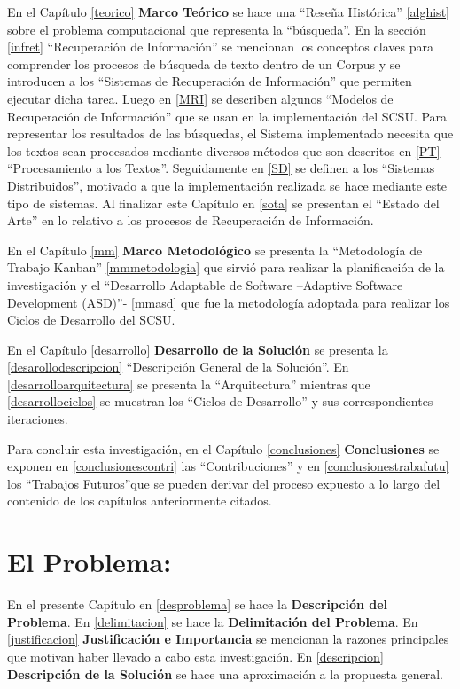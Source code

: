 \documentclass[
  12pt,
  openany]{book}
\begin{document}
En el Capítulo \ref{teorico} \textbf{Marco Teórico} se hace una ``Reseña Histórica'' \ref{alghist} sobre el problema computacional que representa la ``búsqueda''. En la sección \ref{infret} ``Recuperación de Información'' se mencionan los conceptos claves para comprender los procesos de búsqueda de texto dentro de un Corpus y se introducen a los ``Sistemas de Recuperación de Información'' que permiten ejecutar dicha tarea. Luego en \ref{MRI} se describen algunos ``Modelos de Recuperación de Información'' que se usan en la implementación del SCSU. Para representar los resultados de las búsquedas, el Sistema implementado necesita que los textos sean procesados mediante diversos métodos que son descritos en \ref{PT} ``Procesamiento a los Textos''. Seguidamente en \ref{SD} se definen a los ``Sistemas Distribuidos'', motivado a que la implementación realizada se hace mediante este tipo de sistemas. Al finalizar este Capítulo en \ref{sota} se presentan el ``Estado del Arte'' en lo relativo a los procesos de Recuperación de Información.

En el Capítulo \ref{mm} \textbf{Marco Metodológico} se presenta la ``Metodología de Trabajo Kanban'' \ref{mmmetodologia} que sirvió para realizar la planificación de la investigación y el ``Desarrollo Adaptable de Software --Adaptive Software Development (ASD)''- \ref{mmasd} que fue la metodología adoptada para realizar los Ciclos de Desarrollo del SCSU.

En el Capítulo \ref{desarrollo} \textbf{Desarrollo de la Solución} se presenta la \ref{desarollodescripcion} ``Descripción General de la Solución''. En \ref{desarrolloarquitectura} se presenta la ``Arquitectura'' mientras que \ref{desarrollociclos} se muestran los ``Ciclos de Desarrollo'' y sus correspondientes iteraciones.

Para concluir esta investigación, en el Capítulo \ref{conclusiones} \textbf{Conclusiones} se exponen en \ref{conclusionescontri} las ``Contribuciones'' y en \ref{conclusionestrabafutu} los ``Trabajos Futuros''que se pueden derivar del proceso expuesto a lo largo del contenido de los capítulos anteriormente citados.

\hypertarget{capproblema}{%
\chapter{El Problema:}\label{capproblema}}

En el presente Capítulo en \ref{desproblema} se hace la \textbf{Descripción del Problema}. En \ref{delimitacion} se hace la \textbf{Delimitación del Problema}. En \ref{justificacion} \textbf{Justificación e Importancia} se mencionan la razones principales que motivan haber llevado a cabo esta investigación. En \ref{descripcion} \textbf{Descripción de la Solución} se hace una aproximación a la propuesta general.
\end{document}
